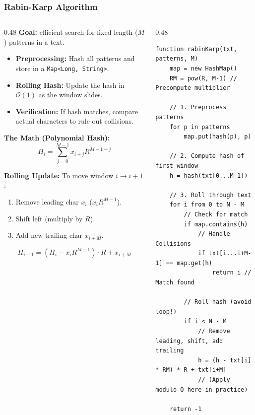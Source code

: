 \documentclass[8pt,aspectratio=169]{beamer}
\begin{document}
\begin{frame}[fragile]
\frametitle{Rabin-Karp Algorithm}

\begin{columns}[T]
    \begin{column}{0.48\textwidth}
        \textbf{Goal:} efficient search for fixed-length ($M$) patterns in a text.
        \begin{itemize}
            \item \textbf{Preprocessing:} Hash all patterns and store in a \texttt{Map<Long, String>}.
            \item \textbf{Rolling Hash:} Update the hash in $\mathcal{O}(1)$ as the window slides.
            \item \textbf{Verification:} If hash matches, compare actual characters to rule out collisions.
        \end{itemize}
        
        \vspace{0.5em}
        \textbf{The Math (Polynomial Hash):}
        $$ H_i = \sum_{j=0}^{M-1} x_{i+j} R^{M-1-j} $$
        
        \textbf{Rolling Update:} To move window $i \to i+1$:
        \begin{enumerate}
            \item Remove leading char $x_i$ ($x_i R^{M-1}$).
            \item Shift left (multiply by $R$).
            \item Add new trailing char $x_{i+M}$.
        \end{enumerate}
        $$ H_{i+1} = (H_i - x_i R^{M-1}) \cdot R + x_{i+M} $$
    \end{column}

    \begin{column}{0.48\textwidth}
    \begin{lstlisting}[basicstyle=\tiny\ttfamily, frame=single]
function rabinKarp(txt, patterns, M)
    map = new HashMap()
    RM = pow(R, M-1) // Precompute multiplier
    
    // 1. Preprocess patterns
    for p in patterns
        map.put(hash(p), p)

    // 2. Compute hash of first window
    h = hash(txt[0...M-1])

    // 3. Roll through text
    for i from 0 to N - M
        // Check for match
        if map.contains(h)
            // Handle Collisions
            if txt[i...i+M-1] == map.get(h)
                return i // Match found

        // Roll hash (avoid loop!)
        if i < N - M
            // Remove leading, shift, add trailing
            h = (h - txt[i] * RM) * R + txt[i+M]
            // (Apply modulo Q here in practice)
            
    return -1
    \end{lstlisting}
    \end{column}
\end{columns}

\end{frame}
\end{document}
